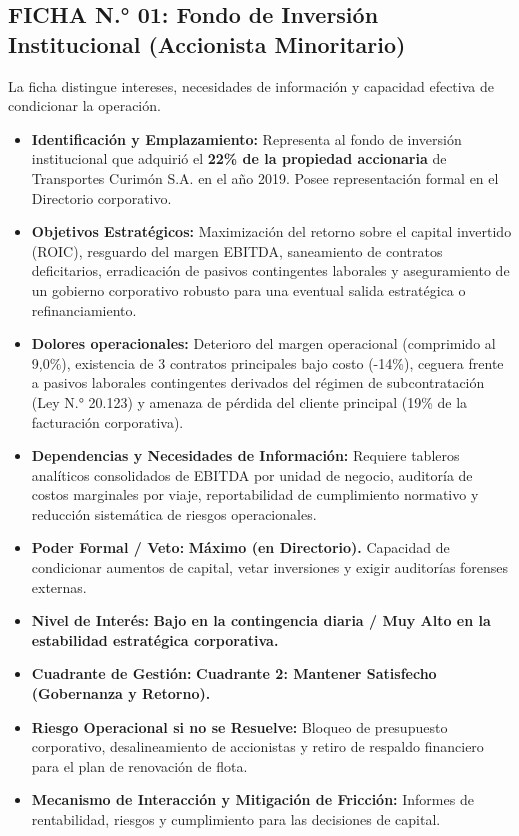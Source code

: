 \subsection*{FICHA N.° 01: Fondo de Inversión Institucional (Accionista Minoritario)}
La ficha distingue intereses, necesidades de información y capacidad efectiva de condicionar la operación.
\begin{itemize}
\item \textbf{Identificación y Emplazamiento:} Representa al fondo de inversión institucional que adquirió el \textbf{22\% de la propiedad accionaria} de Transportes Curimón S.A. en el año 2019. Posee representación formal en el Directorio corporativo.
\item \textbf{Objetivos Estratégicos:} Maximización del retorno sobre el capital invertido (ROIC), resguardo del margen EBITDA, saneamiento de contratos deficitarios, erradicación de pasivos contingentes laborales y aseguramiento de un gobierno corporativo robusto para una eventual salida estratégica o refinanciamiento.
\item \textbf{Dolores operacionales:} Deterioro del margen operacional (comprimido al 9,0\%), existencia de 3 contratos principales bajo costo (-14\%), ceguera frente a pasivos laborales contingentes derivados del régimen de subcontratación (Ley N.° 20.123) y amenaza de pérdida del cliente principal (19\% de la facturación corporativa).
\item \textbf{Dependencias y Necesidades de Información:} Requiere tableros analíticos consolidados de EBITDA por unidad de negocio, auditoría de costos marginales por viaje, reportabilidad de cumplimiento normativo y reducción sistemática de riesgos operacionales.
\item \textbf{Poder Formal / Veto:} \textbf{Máximo (en Directorio).} Capacidad de condicionar aumentos de capital, vetar inversiones y exigir auditorías forenses externas.
\item \textbf{Nivel de Interés:} \textbf{Bajo en la contingencia diaria / Muy Alto en la estabilidad estratégica corporativa.}
\item \textbf{Cuadrante de Gestión:} \textbf{Cuadrante 2: Mantener Satisfecho (Gobernanza y Retorno).}
\item \textbf{Riesgo Operacional si no se Resuelve:} Bloqueo de presupuesto corporativo, desalineamiento de accionistas y retiro de respaldo financiero para el plan de renovación de flota.
\item \textbf{Mecanismo de Interacción y Mitigación de Fricción:} Informes de rentabilidad, riesgos y cumplimiento para las decisiones de capital.
\end{itemize}
